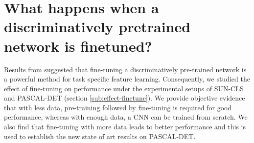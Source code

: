 
\section{What happens when a discriminatively pretrained network is finetuned?}
\label{sec:fine}


Results from \cite{Rcnn} suggested that fine-tuning a discriminatively pre-trained network is a powerful method for task specific feature learning. Consequently, we studied the effect of fine-tuning on performance under the experimental setups of SUN-CLS and PASCAL-DET (section \ref{sub:effect-finetune}). We provide objective evidence that with less data, pre-training followed by fine-tuning is required for good performance, whereas with enough data, a CNN can be trained from scratch. We also find that fine-tuning with more data leads to better performance and this is used to establish the new state of art results on PASCAL-DET.

